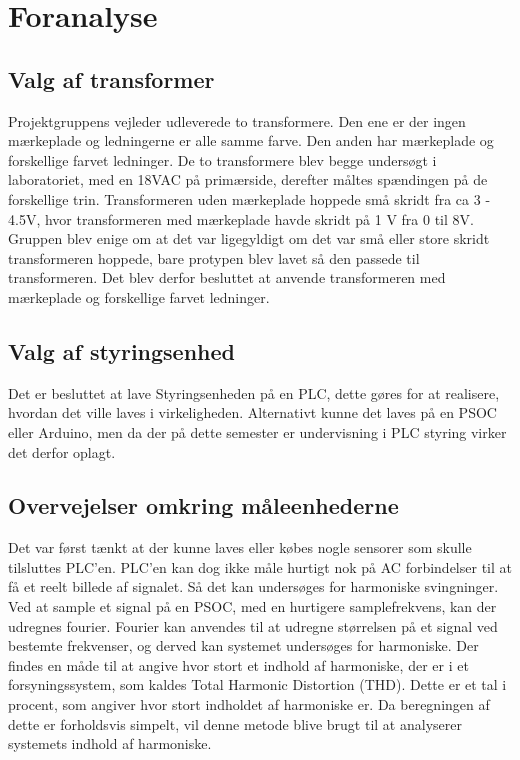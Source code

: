 
\chapter{Foranalyse}

\section{Valg af transformer}
Projektgruppens vejleder udleverede to transformere. Den ene er der ingen mærkeplade og ledningerne er alle samme farve. Den anden har mærkeplade og forskellige farvet ledninger. De to transformere blev begge undersøgt i laboratoriet, med en 18VAC på primærside, derefter måltes spændingen på de forskellige trin. Transformeren uden mærkeplade hoppede små skridt fra ca 3 - 4.5V, hvor transformeren med mærkeplade havde skridt på 1 V fra 0 til 8V. Gruppen blev enige om at det var ligegyldigt om det var små eller store skridt transformeren hoppede, bare protypen blev lavet så den passede til transformeren. Det blev derfor besluttet at anvende transformeren med mærkeplade og forskellige farvet ledninger. 

\section{Valg af styringsenhed}
Det er besluttet at lave Styringsenheden på en PLC, dette gøres for at realisere, hvordan det ville laves i virkeligheden. Alternativt kunne det laves på en PSOC eller Arduino, men da der på dette semester er undervisning i PLC styring virker det derfor oplagt.

\section{Overvejelser omkring måleenhederne}
Det var først tænkt at der kunne laves eller købes nogle sensorer som skulle tilsluttes PLC'en. PLC'en kan dog ikke måle hurtigt nok på AC forbindelser til at få et reelt billede af signalet. Så det kan undersøges for harmoniske svingninger. Ved at sample et signal på en PSOC, med en hurtigere samplefrekvens, kan der udregnes fourier. Fourier kan anvendes til at udregne størrelsen på et signal ved bestemte frekvenser, og derved kan systemet undersøges for harmoniske. Der findes en måde til at angive hvor stort et indhold af harmoniske, der er i et forsyningssystem, som kaldes Total Harmonic Distortion (THD). Dette er et tal i procent, som angiver hvor stort indholdet af harmoniske er. Da beregningen af dette er forholdsvis simpelt, vil denne metode blive brugt til at analyserer systemets indhold af harmoniske. 

